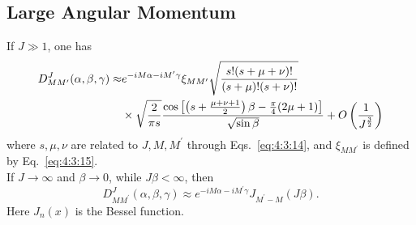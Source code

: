 \subsection{Large Angular Momentum}\label{sec:4.18.1}
If $J \gg 1$, one has
\begin{align}
D_{M M^{\prime}}^{J}(\alpha, \beta, \gamma) \approx & e^{-i M \alpha-i M^{\prime} \gamma} \xi_{M M^{\prime}} \sqrt{\frac{s!(s+\mu+\nu)!}{(s+\mu)!(s+\nu)!}}  \notag\\
& \times \sqrt{\frac{2}{\pi s}} \frac{\cos \left[\left(s+\frac{\mu+\nu+1}{2}\right) \beta-\frac{\pi}{4}(2 \mu+1)\right]}{\sqrt{\sin \beta}}+O\left(\frac{1}{J^{\frac{3}{2}}}\right) \label{eq:4:18:1}
\end{align}
where $s, \mu, \nu$ are related to $J, M, M^{\prime}$ through Eqs.~\eqref{eq:4:3:14}, and $\xi_{M M^{\prime}}$ is defined by Eq.~\eqref{eq:4:3:15}.\\
If $J \rightarrow \infty$ and $\beta \rightarrow 0$, while $J \beta<\infty$, then
\begin{equation}
D_{M M^{\prime}}^{J}(\alpha, \beta, \gamma) \approx e^{-i M \alpha-i M^{\prime} \gamma} J_{M^{\prime}-M}(J \beta) . \label{eq:4:18:2}
\end{equation}
Here $J_{n}(x)$ is the Bessel function.

